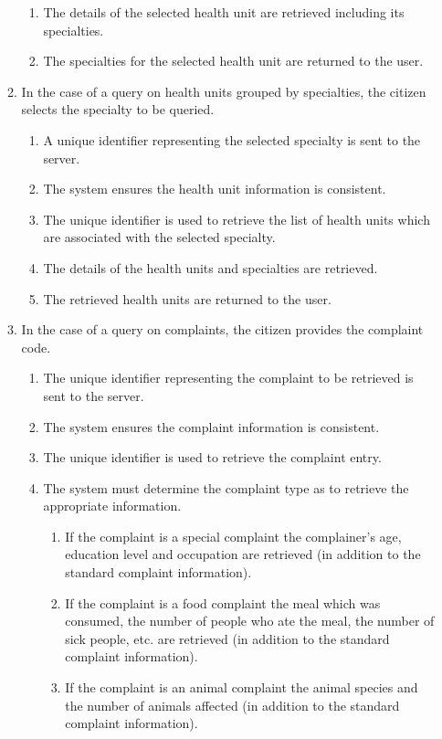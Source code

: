\documentclass[11pt,twoside]{article}
\begin{document}
\begin{enumerate}
\begin{enumerate}
\begin{enumerate}
\item The details of the selected health unit are retrieved including its
specialties.
\item The specialties for the selected health unit are returned to the
user.
\end{enumerate}
\item In the case of a query on health units grouped by specialties, the
citizen selects the specialty to be queried.
\begin{enumerate}
\item A unique identifier representing the selected specialty is sent to
the server.
\item The system ensures the health unit information is consistent.
\item The unique identifier is used to retrieve the list of health units
which are associated with the selected specialty.
\item The details of the health units and specialties are retrieved.
\item The retrieved health units are returned to the user.
\end{enumerate}
\item In the case of a query on complaints, the citizen provides the
complaint code.
\begin{enumerate}
\item The unique identifier representing the complaint to be retrieved
is sent to the server.
\item The system ensures the complaint information is consistent.
\item The unique identifier is used to retrieve the complaint entry.
\item The system must determine the complaint type as to retrieve
the appropriate information.
\begin{enumerate}
\item If the complaint is a special complaint the complainer's
age, education level and occupation are retrieved (in
addition to the standard complaint information).
\item If the complaint is a food complaint the meal which was
consumed, the number of people who ate the meal, the
number of sick people, etc. are retrieved (in addition to
the standard complaint information).
\item If the complaint is an animal complaint the animal
species and the number of animals affected (in addition
to the standard complaint information).
\end{enumerate}

\end{enumerate}
\end{enumerate}
\end{enumerate}
\end{document}
